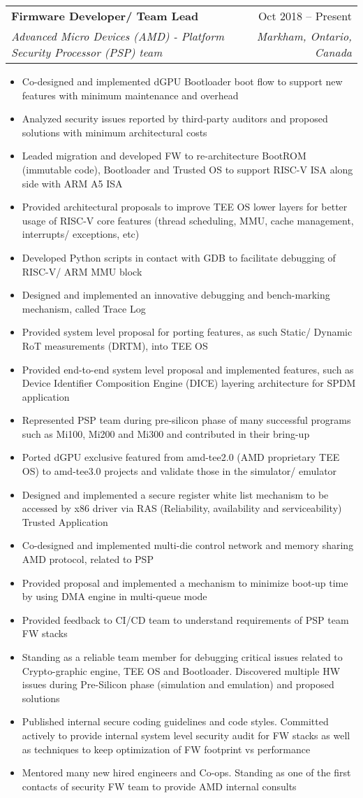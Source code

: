 \documentclass[letterpaper,11pt]{article}
\makeatletter
\newcommand{\resumeItem}[1]{
  \item{
    {#1 \vspace{-4pt}}
  }
}
\newcommand{\resumeSubheading}[4]{
  \vspace{-2pt}\item
    \begin{tabular*}{0.97\textwidth}[t]{l@{\extracolsep{\fill}}r}
      \textbf{#1} & #2 \\
      \textit{\small #3} & \textit{\small #4} \\
    \end{tabular*}\vspace{-10pt}
}
\newcommand{\resumeItemListStart}{\begin{itemize}}
\newcommand{\resumeItemListEnd}{\end{itemize}\vspace{-2pt}}
\makeatother
\begin{document}
\resumeSubheading
        {Firmware Developer/ Team Lead}{Oct 2018 -- Present}
        {Advanced Micro Devices (AMD) - Platform Security Processor (PSP) team}{Markham, Ontario, Canada}
      \resumeItemListStart
        \small
\resumeItem{Co-designed and implemented dGPU Bootloader boot flow to support new features with minimum maintenance and overhead}
\resumeItem{Analyzed security issues reported by third-party auditors and proposed solutions with minimum architectural costs}
\resumeItem{Leaded migration and developed FW to re-architecture BootROM (immutable code), Bootloader and Trusted OS to support RISC-V ISA along side with ARM A5 ISA}
\resumeItem{Provided architectural proposals to improve TEE OS lower layers for better usage of RISC-V core features (thread scheduling, MMU, cache management, interrupts/ exceptions, etc)}
\resumeItem{Developed Python scripts in contact with GDB to facilitate debugging of RISC-V/ ARM MMU block}
\resumeItem{Designed and implemented an innovative debugging and bench-marking mechanism, called Trace Log}
\resumeItem{Provided system level proposal for porting features, as such  Static/ Dynamic RoT measurements (DRTM), into TEE OS}
\resumeItem{Provided end-to-end system level proposal and implemented features, such as Device Identifier Composition Engine (DICE) layering architecture for SPDM application}
\resumeItem{Represented PSP team during pre-silicon phase of many successful programs such as Mi100, Mi200 and Mi300 and contributed in their bring-up}
\resumeItem{Ported dGPU exclusive featured from amd-tee2.0 (AMD proprietary TEE OS) to amd-tee3.0 projects and validate those in the simulator/ emulator}
\resumeItem{Designed and implemented a secure register white list mechanism to be accessed by x86 driver via RAS (Reliability, availability and serviceability) Trusted Application}
\resumeItem{Co-designed and implemented multi-die control network and memory sharing AMD protocol, related to PSP} 
\resumeItem{Provided proposal and implemented a mechanism to minimize boot-up time by using DMA engine in multi-queue mode}
\resumeItem{Provided feedback to CI/CD team to understand requirements of PSP team FW stacks}
\resumeItem{Standing as a reliable team member for debugging critical issues related to Crypto-graphic engine, TEE OS and Bootloader. Discovered multiple HW issues during Pre-Silicon phase (simulation and emulation) and proposed solutions}
\resumeItem{Published internal secure coding guidelines and code styles. Committed actively to provide internal system level security audit for FW stacks as well as techniques to keep optimization of FW footprint vs performance}
\resumeItem{Mentored many new hired engineers and Co-ops. Standing as one of the first contacts of security FW team to provide AMD internal consults}
    \resumeItemListEnd
\end{document}
